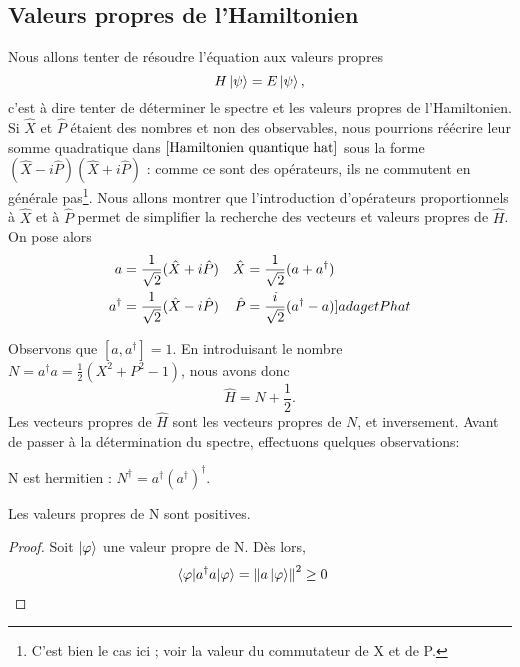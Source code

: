 \documentclass[../Notesdecours.tex]{subfiles}
\begin{document}
\subsection{Valeurs propres de l'Hamiltonien}
Nous allons tenter de résoudre l'équation aux valeurs propres 
\begin{equation}
    H\ket{\psi} = E\ket{\psi},
\end{equation}
c'est à dire tenter de déterminer le spectre et les valeurs propres de l'Hamiltonien.\\

Si $\hat{X}$ et $\hat{P}$ étaient des nombres et non des observables, nous pourrions réécrire leur somme quadratique dans $\eqref{Hamiltonien quantique hat}$ sous la forme $(\hat{X}-i\hat{P})(\hat{X}+i\hat{P})$ : comme ce sont des opérateurs, ils ne commutent en générale pas\footnote{C'est bien le cas ici ; voir la valeur du commutateur de X et de P.}. Nous allons montrer que l'introduction d'opérateurs proportionnels à $\hat{X}$ et à $\hat{P}$ permet de simplifier la recherche des vecteurs et valeurs propres de $\hat{H}$. On pose alors
\begin{align}
    a &= \frac{1}{\sqrt{2}}(\hat{X}+i\hat{P})   & \hat{X} &= \frac{1}{\sqrt{2}}(a+a^\dagger)\label{a et X hat}\\
    a^\dagger &= \frac{1}{\sqrt{2}}(\hat{X}-i\hat{P})    & \hat{P} &= \frac{i}{\sqrt{2}}(a^\dagger-a) \label[]{a dag et P hat}
\end{align}

Observons que $[a,a^\dagger] = 1$. En introduisant le nombre $N = a^\dagger a = \frac{1}{2}\left(X^2+P^2-1\right)$, nous avons donc
\begin{equation}
    \hat{H} = N+\frac{1}{2}.
\end{equation}
Les vecteurs propres de $\hat{H}$ sont les vecteurs propres de $N$, et inversement. Avant de passer à la détermination du spectre, effectuons quelques observations:
\begin{Property}
    N est hermitien : $N^\dagger = a^\dagger \left(a^\dagger\right)^\dagger$.
\end{Property}
\begin{Property}
    \label{N positif}
    Les valeurs propres de N sont positives.
\end{Property}
\begin{proof}
    Soit $\ket{\varphi}$ une valeur propre de N. Dès lors,
    \begin{align*}
        \braket{\varphi|a^\dagger a|\varphi} &= \norm{a\ket{\varphi}}^2 \geq 0
    \end{align*}
\end{proof}
\end{document}
